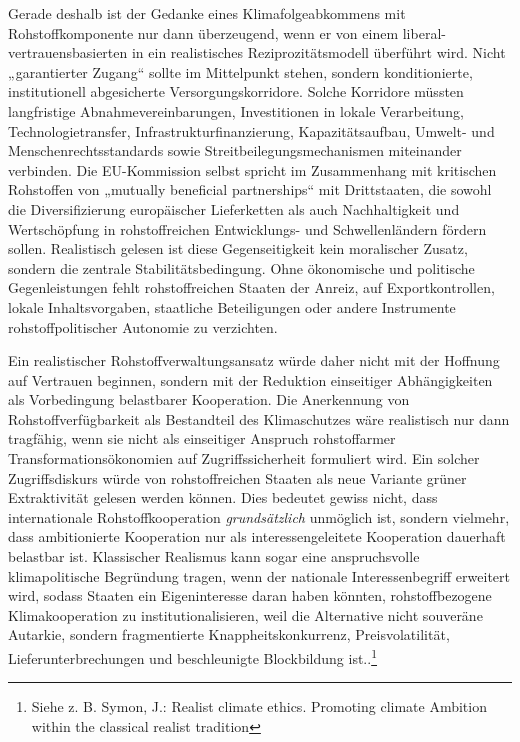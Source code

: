 \documentclass[12pt,a4paper,oneside]{book} %
\begin{document}
{Gerade deshalb ist der Gedanke eines Klimafolgeabkommens mit Rohstoffkomponente nur dann überzeugend, wenn er von einem liberal-vertrauensbasierten in ein realistisches Reziprozitätsmodell überführt wird. Nicht „garantierter Zugang“ sollte im Mittelpunkt stehen, sondern konditionierte, institutionell abgesicherte Versorgungskorridore. Solche Korridore müssten langfristige Abnahmevereinbarungen, Investitionen in lokale Verarbeitung, Technologietransfer, Infrastrukturfinanzierung, Kapazitätsaufbau, Umwelt- und Menschenrechtsstandards sowie Streitbeilegungsmechanismen miteinander verbinden. Die EU-Kommission selbst spricht im Zusammenhang mit kritischen Rohstoffen von „mutually beneficial partnerships“ mit Drittstaaten, die sowohl die Diversifizierung europäischer Lieferketten als auch Nachhaltigkeit und Wertschöpfung in rohstoffreichen Entwicklungs- und Schwellenländern fördern sollen. Realistisch gelesen ist diese Gegenseitigkeit kein moralischer Zusatz, sondern die zentrale Stabilitätsbedingung. Ohne ökonomische und politische Gegenleistungen fehlt rohstoffreichen Staaten der Anreiz, auf Exportkontrollen, lokale Inhaltsvorgaben, staatliche Beteiligungen oder andere Instrumente rohstoffpolitischer Autonomie zu verzichten.

Ein realistischer Rohstoffverwaltungsansatz würde daher nicht mit der Hoffnung auf Vertrauen beginnen, sondern mit der Reduktion einseitiger Abhängigkeiten als Vorbedingung belastbarer Kooperation. Die Anerkennung von Rohstoffverfügbarkeit als Bestandteil des Klimaschutzes wäre realistisch nur dann tragfähig, wenn sie nicht als einseitiger Anspruch rohstoffarmer Transformationsökonomien auf Zugriffssicherheit formuliert wird. Ein solcher Zugriffsdiskurs würde von rohstoffreichen Staaten als neue Variante grüner Extraktivität gelesen werden können. Dies bedeutet gewiss nicht, dass internationale Rohstoffkooperation \textit{grundsätzlich } unmöglich ist, sondern vielmehr, dass ambitionierte Kooperation nur als interessengeleitete Kooperation dauerhaft belastbar ist. Klassischer Realismus kann sogar eine anspruchsvolle klimapolitische Begründung tragen, wenn der nationale Interessenbegriff erweitert wird, sodass Staaten ein Eigeninteresse daran haben könnten, rohstoffbezogene Klimakooperation zu institutionalisieren, weil die Alternative nicht souveräne Autarkie, sondern fragmentierte Knappheitskonkurrenz, Preisvolatilität, Lieferunterbrechungen und beschleunigte Blockbildung ist..\footnote{Siehe z. B. Symon, J.: Realist climate ethics. Promoting climate Ambition within the classical realist tradition}

}
\end{document}
